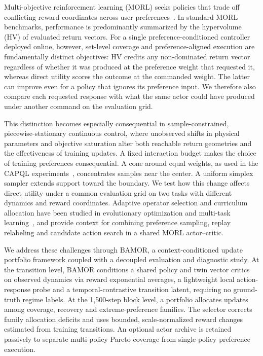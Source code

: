\documentclass[10pt]{article}
\let\cite\citep
\begin{document}
Multi-objective reinforcement learning (MORL) seeks policies that trade off
conflicting reward coordinates across user preferences~\cite{Hayes2022MORL}.
In standard MORL benchmarks, performance is predominantly summarized by the
hypervolume (HV) of evaluated return vectors. For a single preference-conditioned
controller deployed online, however, set-level coverage and preference-aligned
execution are fundamentally distinct objectives: HV credits any non-dominated
return vector regardless of whether it was produced at the preference weight
that requested it, whereas direct utility scores the outcome at the
commanded weight. The latter can improve even for a policy that ignores its
preference input. We therefore also compare each requested response with
what the same actor could have produced under another command on the
evaluation grid.

This distinction becomes especially consequential in sample-constrained,
piecewise-stationary continuous control, where unobserved shifts in physical
parameters and objective saturation alter both reachable return geometries and
the effectiveness of training updates. A fixed interaction budget makes the
choice of training preferences consequential. A cone around equal weights,
as used in the CAPQL experiments~\cite{Lu2023CAPQL}, concentrates samples near
the center. A uniform simplex sampler extends support toward the boundary.
We test how this change affects direct utility under a common evaluation grid
on two tasks with different dynamics and reward coordinates. Adaptive operator
selection and curriculum allocation have been studied in evolutionary
optimization and multi-task learning~\cite{DaCosta2008AOS,Graves2017Curriculum},
and provide context for combining preference sampling, replay relabeling and
candidate action search in a shared MORL actor--critic.

We address these challenges through BAMOR, a context-conditioned update
portfolio framework coupled with a decoupled evaluation and diagnostic study.
At the transition level, BAMOR conditions a shared policy and twin vector
critics on observed dynamics via reward exponential averages, a lightweight
local action-response probe and a temporal-contrastive transition latent,
requiring no ground-truth regime labels. At the 1,500-step block level, a
portfolio allocates updates among coverage, recovery and extreme-preference
families. The selector corrects family allocation deficits and uses bounded,
scale-normalized reward changes estimated from training transitions. An
optional actor archive is retained passively to separate multi-policy Pareto
coverage from single-policy preference execution.
\end{document}
